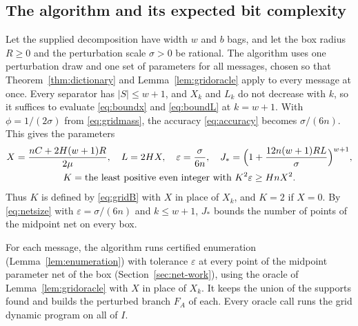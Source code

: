 \subsection{The algorithm and its expected bit complexity}
\label{sec:spectral-main}
Let the supplied decomposition have width $w$ and $b$ bags, and let the
box radius $R\ge0$ and the perturbation scale $\sigma>0$ be rational.
The algorithm uses one perturbation draw and one set of parameters for
all messages, chosen so that Theorem~\ref{thm:dictionary} and
Lemma~\ref{lem:gridoracle} apply to every message at once. Every
separator has $|S|\le w+1$, and $X_k$ and $L_k$ do not decrease with $k$,
so it suffices to evaluate \eqref{eq:boundx} and \eqref{eq:boundL} at
$k=w+1$. With $\phi=1/(2\sigma)$ from \eqref{eq:gridmass}, the accuracy
\eqref{eq:accuracy} becomes $\sigma/(6n)$. This gives the parameters
\begin{equation}\label{eq:mainparameters}
\begin{gathered}
 X=\frac{nC+2H(w+1)R}{2\mu},\quad L=2HX,\quad
 \varepsilon=\frac{\sigma}{6n},\quad
 J_*=\Bigl(1+\frac{12n(w+1)RL}{\sigma}\Bigr)^{w+1},\\
 K=\text{the least positive even integer with }K^2\varepsilon\ge HnX^2.
\end{gathered}
\end{equation}
Thus $K$ is defined by \eqref{eq:gridB} with $X$ in place of $X_k$, and
$K=2$ if $X=0$. By \eqref{eq:netsize} with $\varepsilon=\sigma/(6n)$ and
$k\le w+1$, $J_*$ bounds the number of points of the midpoint net on
every box.

For each message, the algorithm runs certified enumeration
(Lemma~\ref{lem:enumeration}) with tolerance $\varepsilon$ at every
point of the midpoint parameter net of the box
(Section~\ref{sec:net-work}), using the oracle of
Lemma~\ref{lem:gridoracle} with $X$ in place of $X_k$. It keeps the
union of the supports found and builds the perturbed branch $F_A$ of
each. Every oracle call runs the grid dynamic program on all of $I$.

